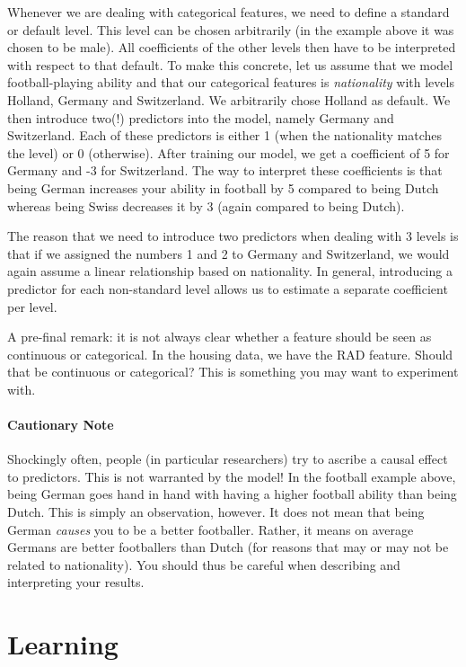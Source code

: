 \documentclass[11pt, leqno, a4paper]{article}
\begin{document}
Whenever we are dealing with categorical features, we need to define a standard or default level. This
level can be chosen arbitrarily (in the example above it was chosen to be male). 
All coefficients of the other levels then have to be interpreted with
respect to that default. To make this concrete, let us assume that we model football-playing ability and
that our categorical features is \textit{nationality} with levels Holland, Germany and Switzerland.
We arbitrarily chose Holland as default. We then introduce two(!) predictors into the model, namely
Germany and Switzerland. Each of these predictors is either 1 (when the nationality matches the level)
or 0 (otherwise). After training our model, we get a coefficient of 5 for Germany and -3 for Switzerland.
The way to interpret these coefficients is that being German increases your ability in football by 5
compared to being Dutch whereas being Swiss decreases it by 3 (again compared to being Dutch).

The reason that we need to introduce two predictors when dealing with 3 levels is that if we assigned
the numbers 1 and 2 to Germany and Switzerland, we would again assume a linear relationship based on
nationality. In general, introducing a predictor for each non-standard level allows us to estimate a separate coefficient
per level.

A pre-final remark: it is not always clear whether a feature should be seen as continuous or categorical.
In the housing data, we have the RAD feature. Should that be continuous or categorical? This is
something you may want to experiment with.

\paragraph{Cautionary Note} Shockingly often, people (in particular researchers) try to ascribe 
a causal effect to predictors. This is not warranted by the model! In the football example above, being
German goes hand in hand with having a higher football ability than being Dutch. This is simply an 
observation, however. It does not mean that being German \textit{causes} you to be a better footballer.
Rather, it means on average Germans are better footballers than Dutch
(for reasons that may or may not be related to nationality). You
should thus be careful when describing and interpreting your results.

\section{Learning}
\end{document}
